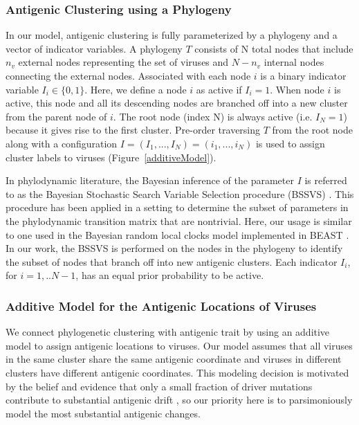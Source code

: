 \documentclass[11pt,oneside,letterpaper]{article}
\begin{document}
\subsubsection*{Antigenic Clustering using a Phylogeny}

In our model, antigenic clustering is fully parameterized by  a phylogeny and a vector of indicator variables.
A phylogeny $T$ consists of N total nodes that include $n_v$ external nodes representing the set of viruses and $N-n_v$ internal nodes connecting the external nodes.
Associated with each node $i$ is a binary indicator variable $I_i \in \{0,1\}$. 
Here, we define a node $i$ as active if $I_i = 1$.
When node $i$ is active, this node and all its descending nodes are branched off into a new cluster from the parent node of $i$.
The root node (index N) is always active (i.e. $I_{N} = 1$) because it gives rise to the first cluster.
Pre-order traversing $T$ from the root node along with a configuration $I=(I_1, ..., I_N)=(i_1, ..., i_N)$ is used to assign cluster labels to viruses (Figure~\ref{additiveModel}).

In phylodynamic literature, the Bayesian inference of the parameter $I$ is referred to as the Bayesian Stochastic Search Variable Selection procedure (BSSVS) \cite{lemey_bayesian_2009}.
This procedure has been applied in a setting to determine the subset of parameters in the phylodynamic transition matrix that are nontrivial. 
Here, our usage is similar to one used in the Bayesian random local clocks model implemented in BEAST \cite{drummond_bayesian_2010}.
In our work, the BSSVS is performed on the nodes in the phylogeny to identify the subset of nodes that branch off into new antigenic clusters. 
Each indicator $I_i$, for $i=1,..N-1$, has an equal prior probability to be active.



\subsubsection*{Additive Model for the Antigenic Locations of Viruses}

We connect phylogenetic clustering with antigenic trait by using an additive model to assign antigenic locations to viruses. 
Our model assumes that all viruses in the same cluster share the same antigenic coordinate and viruses in different clusters have different antigenic coordinates.
This modeling decision is motivated by the belief \cite{Bedford12} and evidence \cite{koel_substitutions_2013} that only a small fraction of driver mutations contribute to substantial antigenic drift , so our priority here is to parsimoniously model the most substantial antigenic changes.
\end{document}

